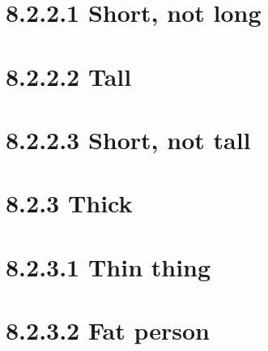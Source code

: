 \section*{8.2.2.1 Short, not long}
\begin{entrylist}
 {}
 {}
\end{entrylist}

\section*{8.2.2.2 Tall}
\begin{entrylist}
 {}
 {}
\end{entrylist}

\section*{8.2.2.3 Short, not tall}
\begin{entrylist}
 {}
 {}
\end{entrylist}

\section*{8.2.3 Thick}
\begin{entrylist}
 {}
\end{entrylist}

\section*{8.2.3.1 Thin thing}
\begin{entrylist}
 {}
\end{entrylist}

\section*{8.2.3.2 Fat person}
\begin{entrylist}
 {}
\end{entrylist}

